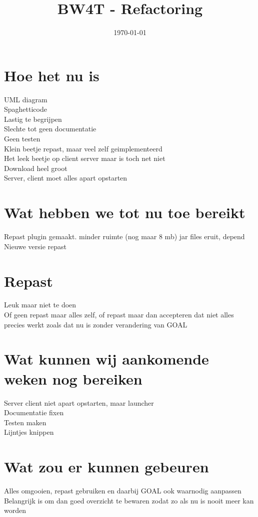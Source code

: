 \documentclass[11pt,a4paper]{article}
\title{BW4T - Refactoring}
\date{\today}
\begin{document}
\maketitle

\section{Hoe het nu is}
UML diagram \\
Spaghetticode \\
Lastig te begrijpen \\
Slechte tot geen documentatie \\
Geen testen \\
Klein beetje repast, maar veel zelf geimplementeerd \\
Het leek beetje op client server maar is toch net niet \\
Download heel groot \\
Server, client moet alles apart opstarten \\

\section{Wat hebben we tot nu toe bereikt}
Repast plugin gemaakt. minder ruimte (nog maar 8 mb) jar files eruit, depend \\
Nieuwe versie repast \\


\section{Repast}
Leuk maar niet te doen \\
Of geen repast maar alles zelf, of repast maar dan accepteren dat niet alles precies werkt zoals dat nu is zonder verandering van GOAL \\

\section{Wat kunnen wij aankomende weken nog bereiken}
Server client niet apart opstarten, maar launcher \\
Documentatie fixen \\
Testen maken \\
Lijntjes knippen \\

\section{Wat zou er kunnen gebeuren}
Alles omgooien, repast gebruiken en daarbij GOAL ook waarnodig aanpassen \\
Belangrijk is om dan goed overzicht te bewaren zodat zo als nu is nooit meer kan worden \\
\end{document}
